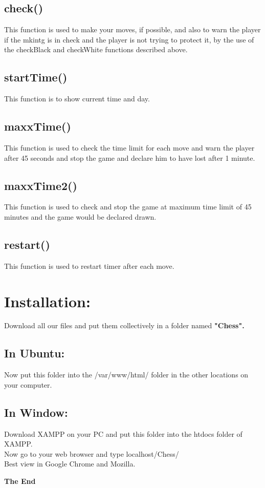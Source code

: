 \documentclass{article}
\begin{document}
\subsection{check()}This function is used to make your moves, if possible, and also to warn the player if the mkintg is in check and the player is not trying to protect it, by the use of the checkBlack and checkWhite functions described above.
\subsection{startTime()}This function is to show current time and day.
\subsection{maxxTime()}This function is used to check the time limit for each move and warn the player after 45 seconds and stop the game and declare him to have lost after 1 minute.
\subsection{maxxTime2()}This function is used to check and stop the game at maximum time limit of 45 minutes and the game would be declared drawn.
\subsection{restart()}This function is used to restart timer after each move.\\


\section{Installation:}
Download all our files and put them collectively in a folder named \textbf{"Chess".}

\subsection{In Ubuntu:} Now put this folder into the /var/www/html/ folder in the other locations on your computer.

\subsection{In Window:} Download XAMPP on your PC and put this folder into the htdocs folder of XAMPP.\\

Now go to your web browser and type localhost/Chess/\\

Best view in Google Chrome and Mozilla.

\begin{center}
\textbf{The End}
\end{center}
\end{document}
